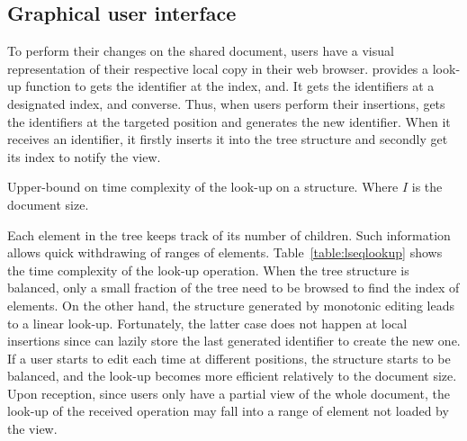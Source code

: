 \subsection{Graphical user interface}

To perform their changes on the shared document, users have a visual
representation of their respective local copy in their web browser.  \CRATE
provides a look-up function to gets the identifier at the index, and. It gets
the identifiers at a designated index, and converse. Thus, when users perform
their insertions, \CRATE gets the identifiers at the targeted position and
generates the new identifier. When it receives an identifier, it firstly inserts
it into the tree structure and secondly get its index to notify the view.

\begin{table}
  \centering
  
  \caption{\label{table:lseqlookup}
    Upper-bound on time complexity of the look-up on a \LSEQ structure.
    Where $I$ is the document size.}
\end{table}

Each element in the tree keeps track of its number of children. Such information
allows quick withdrawing of ranges of elements. Table~\ref{table:lseqlookup}
shows the time complexity of the look-up operation. When the tree structure is
balanced, only a small fraction of the tree need to be browsed to find the index
of elements. On the other hand, the structure generated by monotonic editing
leads to a linear look-up. Fortunately, the latter case does not happen at local
insertions since \CRATE can lazily store the last generated identifier to create
the new one. If a user starts to edit each time at different positions, the
structure starts to be balanced, and the look-up becomes more efficient
relatively to the document size. Upon reception, since users only have a partial
view of the whole document, the look-up of the received operation may fall into
a range of element not loaded by the view.

